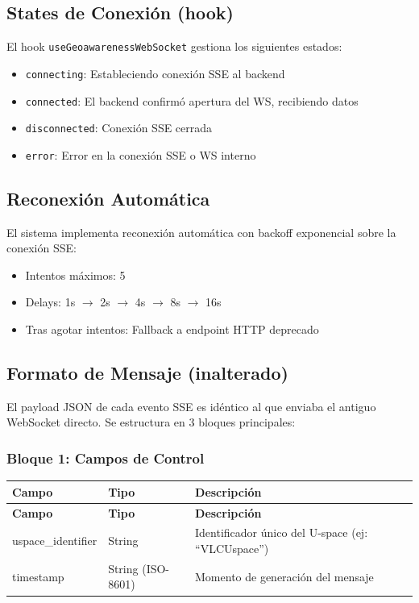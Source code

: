 \documentclass[12pt,a4paper]{article}
\begin{document}
\subsection{States de Conexión (hook)}
El hook \texttt{useGeoawarenessWebSocket} gestiona los siguientes estados:
\begin{itemize}
    \item \texttt{connecting}: Estableciendo conexión SSE al backend
    \item \texttt{connected}: El backend confirmó apertura del WS, recibiendo datos
    \item \texttt{disconnected}: Conexión SSE cerrada
    \item \texttt{error}: Error en la conexión SSE o WS interno
\end{itemize}

\subsection{Reconexión Automática}
El sistema implementa reconexión automática con backoff exponencial sobre la conexión SSE:
\begin{itemize}
    \item Intentos máximos: 5
    \item Delays: 1s $\rightarrow$ 2s $\rightarrow$ 4s $\rightarrow$ 8s $\rightarrow$ 16s
    \item Tras agotar intentos: Fallback a endpoint HTTP deprecado
\end{itemize}

\subsection{Formato de Mensaje (inalterado)}
El payload JSON de cada evento SSE es idéntico al que enviaba el antiguo WebSocket directo. Se estructura en 3 bloques principales:

\subsubsection{Bloque 1: Campos de Control}
\begin{longtable}{|p{4cm}|p{2.5cm}|p{8.5cm}|}
\hline
\textbf{Campo} & \textbf{Tipo} & \textbf{Descripción} \\
\hline
\endfirsthead
\hline
\textbf{Campo} & \textbf{Tipo} & \textbf{Descripción} \\
\hline
\endhead
\hline
\endfoot
\hline
\endlastfoot
uspace\_identifier & String & Identificador único del U-space (ej: ``VLCUspace'') \\
\hline
timestamp & String (ISO-8601) & Momento de generación del mensaje \\
\hline
\end{longtable}
\end{document}
